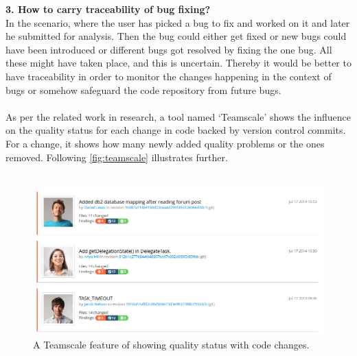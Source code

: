 \textbf{3. How to carry traceability of bug fixing?} \\

In the scenario, where the user has picked a bug to fix and worked on it and later he submitted for analysis. Then the bug could either get fixed or new bugs could have been introduced or different bugs got resolved by fixing the one bug. All these might have taken place, and this is uncertain. Thereby it would be better to have traceability in order to monitor the changes happening in the context of bugs or somehow safeguard the code repository from future bugs. \\ \\

As per the related work in research, \cite{heinemann2014teamscale} a tool named ‘Teamscale’ \cite{teamscale} shows the influence on the quality status for each change in code backed by version control commits. For a change, it shows how many newly added quality problems or the ones removed. Following \autoref{fig:teamscale} illustrates further. \\ \\

\begin{figure}[hbt!]
	\centering
	\includegraphics[width=\linewidth]{figures/teamscale}
	\caption{A Teamscale feature of showing quality status with code changes. \cite{teamscale}}
	\label{fig:teamscale}
\end{figure}

\let\cleardoublepage\clearpage

